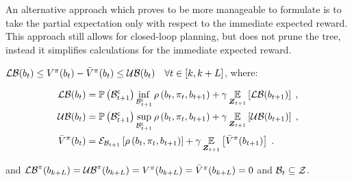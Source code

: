 An alternative approach which proves to be more manageable to formulate is to take the partial expectation only with respect to the immediate expected reward. This approach still allows for closed-loop planning, but does not prune the tree, instead it simplifies calculations for the immediate expected reward.
\begin{corollary}
	\label{thm:val_func_immediate_bounds_obs_bellman}
	$\lowerbound(\blf{t})\leq V^\pi(\blf{t})-\bar{V}^\pi(\blf{t})\leq\upperbound(\blf{t})\quad\forall t\in[k,k+L]$, where:
	\begin{small}
		\begin{subequations}
			\begin{align}
				\lowerbound(\blf{t}) & =\measure{\stcompI{\subSpace}{t+1}}\inf_{\stcompI{\subSpace}{t+1}}\reward{\blf{t},\pi_t,\blf{t+1}}+\gamma\expectation{\lowerbound(\blf{t+1})}{\observationsRV{t+1}}\;,\\
				\upperbound(\blf{t}) & =\measure{\stcompI{\subSpace}{t+1}}\sup_{\stcompI{\subSpace}{t+1}}\reward{\blf{t},\pi_t,\blf{t+1}}+\gamma\expectation{\upperbound(\blf{t+1})}{\observationsRV{t+1}}\;,\\
				\bar{V}^\pi(\blf{t}) & =\partialexpectation{\reward{\blf{t},\pi_{t},\blf{t+1}}}{\subSpaceI{t+1}}+\gamma\expectation{\bar{V}^\pi(\blf{t+1})}{\observationsRV{t+1}}\;.
			\end{align}
		\end{subequations}
	\end{small}
	and $\lowerbound^\pi(\blf{k+L})=\upperbound^\pi(\blf{k+L})=V^\pi(\blf{k+L})=\bar{V}^\pi(\blf{k+L})=0$ and $\subSpaceI{t}\subseteq\observationSpace$.
\end{corollary}

